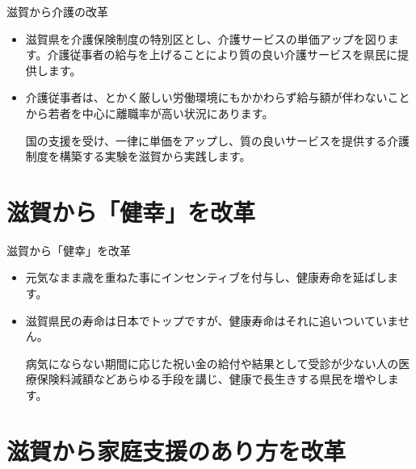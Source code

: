 \documentclass[dvipdfmx]{beamer}
\begin{document}
    \begin{frame}{滋賀から介護の改革}{}
        \begin{small}
            \begin{itemize}
                \setlength{\parsep}{.5mm}
                \setlength{\itemsep}{2mm}
                \item 滋賀県を介護保険制度の特別区とし、介護サービスの単価アップを図ります。介護従事者の給与を上げることにより質の良い介護サービスを県民に提供します。
                \item 介護従事者は、とかく厳しい労働環境にもかかわらず給与額が伴わないことから若者を中心に離職率が高い状況にあります。\par
                国の支援を受け、一律に単価をアップし、質の良いサービスを提供する介護制度を構築する実験を滋賀から実践します。
            \end{itemize}
        \end{small}
    \end{frame}

\section{滋賀から「健幸」を改革}
    \begin{frame}{}{}
        \sectionpage
    \end{frame}

    \begin{frame}{滋賀から「健幸」を改革}{}
        \begin{small}
            \begin{itemize}
                \setlength{\parsep}{.5mm}
                \setlength{\itemsep}{2mm}
                \item 元気なまま歳を重ねた事にインセンティブを付与し、健康寿命を延ばします。
                \item 滋賀県民の寿命は日本でトップですが、健康寿命はそれに追いついていません。\par
                病気にならない期間に応じた祝い金の給付や結果として受診が少ない人の医療保険料減額などあらゆる手段を講じ、健康で長生きする県民を増やします。
            \end{itemize}
        \end{small}
    \end{frame}

\section{滋賀から家庭支援のあり方を改革}
    \begin{frame}{}{}
        \sectionpage
    \end{frame}
\end{document}
